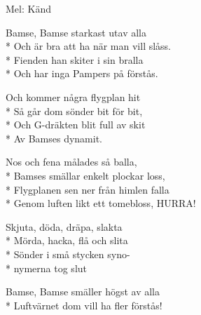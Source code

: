 \begin{SongText}[Bamsevisan]
    \begin{SongInfo}
        Mel: Känd
    \end{SongInfo}
    \begin{SongVerse}
        Bamse, Bamse starkast utav alla\\*%
        Och är bra att ha när man vill slåss.\\*%
        Fienden han skiter i sin bralla\\*%
        Och har inga Pampers på förstås.
    \end{SongVerse}
    \begin{SongVerse}
        Och kommer några flygplan hit\\*%
        Så går dom sönder bit för bit,\\*%
        Och G-dräkten blit full av skit\\*%
        Av Bamses dynamit.
    \end{SongVerse}
    \begin{SongVerse}
        Nos och fena målades så balla,\\*%
        Bamses smällar enkelt plockar loss,\\*%
        Flygplanen sen ner från himlen falla\\*%
        Genom luften likt ett tomebloss, HURRA!
    \end{SongVerse}
    \begin{SongVerse}
        Skjuta, döda, dräpa, slakta\\*%
        Mörda, hacka, flå och slita\\*%
        Sönder i små stycken syno-\\*%
        nymerna tog slut
    \end{SongVerse}
    \begin{SongVerse}
        Bamse, Bamse smäller högst av alla\\*%
        Luftvärnet dom vill ha fler förstås!
    \end{SongVerse}
\end{SongText}
